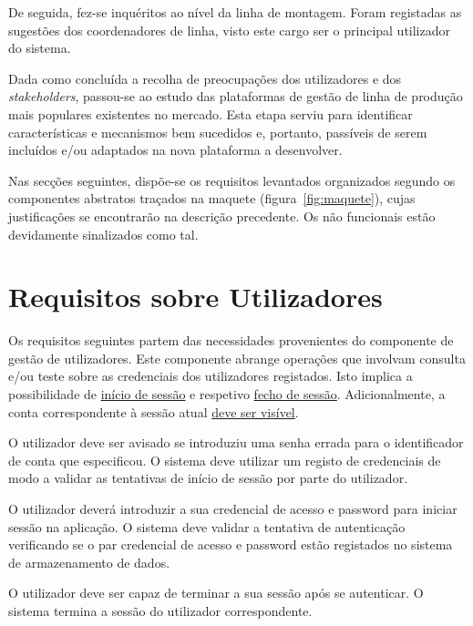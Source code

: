     De seguida, fez-se inquéritos ao nível da linha de montagem. Foram registadas as sugestões dos coordenadores de linha, visto este cargo ser o principal utilizador do sistema.
    
    Dada como concluída a recolha de preocupações dos utilizadores e dos \textit{stakeholders}, passou-se ao estudo das plataformas de gestão de linha de produção mais populares existentes no mercado. Esta etapa serviu para identificar características e mecanismos bem sucedidos e, portanto, passíveis de serem incluídos e/ou adaptados na nova plataforma a desenvolver.

    Nas secções seguintes, dispõe-se os requisitos levantados organizados segundo os componentes abstratos traçados na maquete (figura~\ref{fig:maquete}), cujas justificações se encontrarão na descrição precedente. Os não funcionais estão devidamente sinalizados como tal.

    \newpage
    \section{Requisitos sobre Utilizadores}

        Os requisitos seguintes partem das necessidades provenientes do componente de gestão de utilizadores. Este componente abrange operações que involvam consulta e/ou teste sobre as credenciais dos utilizadores registados. Isto implica a possibilidade de \underline{início de sessão} e respetivo \underline{fecho de sessão}. Adicionalmente, a conta correspondente à sessão atual \underline{deve ser visível}.
        
            {O utilizador deve ser avisado se introduziu uma senha errada para o identificador de conta que especificou.}
            {O sistema deve utilizar um registo de credenciais de modo a validar as tentativas de início de sessão por parte do utilizador.}

            {O utilizador deverá introduzir a sua credencial de acesso e password para iniciar sessão na aplicação.}
            {O sistema deve validar a tentativa de autenticação verificando se o par credencial de acesso e password estão registados no sistema de armazenamento de dados.}
    
            {O utilizador deve ser capaz de terminar a sua sessão após se autenticar.}
            {O sistema termina a sessão do utilizador correspondente.}

